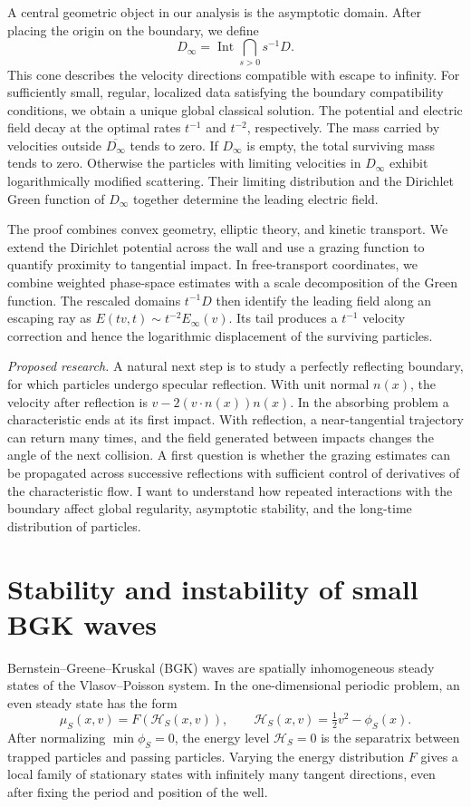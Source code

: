 \documentclass[reqno,10pt,a4paper]{amsart}
\numberwithin{equation}{section}
\begin{document}
A central geometric object in our analysis is the asymptotic domain. After placing the origin on the boundary, we define
\[
 D_\infty=\operatorname{Int}\bigcap_{s>0}s^{-1}D .
\]
This cone describes the velocity directions compatible with escape to infinity. For sufficiently small, regular, localized data satisfying the boundary compatibility conditions, we obtain a unique global classical solution. The potential and electric field decay at the optimal rates $t^{-1}$ and $t^{-2}$, respectively. The mass carried by velocities outside $\overline{D_\infty}$ tends to zero. If $D_\infty$ is empty, the total surviving mass tends to zero. Otherwise the particles with limiting velocities in $D_\infty$ exhibit logarithmically modified scattering. Their limiting distribution and the Dirichlet Green function of $D_\infty$ together determine the leading electric field.

The proof combines convex geometry, elliptic theory, and kinetic transport. We extend the Dirichlet potential across the wall and use a grazing function to quantify proximity to tangential impact. In free-transport coordinates, we combine weighted phase-space estimates with a scale decomposition of the Green function. The rescaled domains $t^{-1}D$ then identify the leading field along an escaping ray as $E(tv,t)\sim t^{-2}E_\infty(v)$. Its tail produces a $t^{-1}$ velocity correction and hence the logarithmic displacement of the surviving particles.

\emph{Proposed research.} A natural next step is to study a perfectly reflecting boundary, for which particles undergo specular reflection. With unit normal $n(x)$, the velocity after reflection is $v-2(v\cdot n(x))n(x)$. In the absorbing problem a characteristic ends at its first impact. With reflection, a near-tangential trajectory can return many times, and the field generated between impacts changes the angle of the next collision. A first question is whether the grazing estimates can be propagated across successive reflections with sufficient control of derivatives of the characteristic flow. I want to understand how repeated interactions with the boundary affect global regularity, asymptotic stability, and the long-time distribution of particles.

\section{Stability and instability of small BGK waves}

Bernstein--Greene--Kruskal (BGK) waves are spatially inhomogeneous steady states of the Vlasov--Poisson system. In the one-dimensional periodic problem, an even steady state has the form
\[
 \mu_S(x,v)=F(\mathcal H_S(x,v)),\qquad
 \mathcal H_S(x,v)=\tfrac12v^2-\phi_S(x).
\]
After normalizing $\min\phi_S=0$, the energy level $\mathcal H_S=0$ is the separatrix between trapped particles and passing particles. Varying the energy distribution $F$ gives a local family of stationary states with infinitely many tangent directions, even after fixing the period and position of the well.
\end{document}
